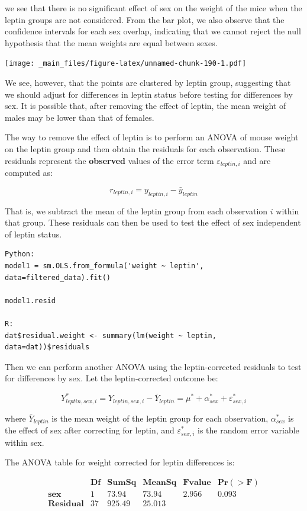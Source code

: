 \documentclass[
]{book}
\begin{document}
we see that there is no significant effect of sex on the weight of the mice when the leptin groups are not considered. From the bar plot, we also observe that the confidence intervals for each sex overlap, indicating that we cannot reject the null hypothesis that the mean weights are equal between sexes.

\texttt{[image: \_main\_files/figure-latex/unnamed-chunk-190-1.pdf]}

We see, however, that the points are clustered by leptin group, suggesting that we should adjust for differences in leptin status before testing for differences by sex. It is possible that, after removing the effect of leptin, the mean weight of males may be lower than that of females.

The way to remove the effect of leptin is to perform an ANOVA of mouse weight on the leptin group and then obtain the residuals for each observation. These residuals represent the \textbf{observed} values of the error term \(\varepsilon_{leptin,i}\) and are computed as:

\[
r_{leptin,i} = y_{leptin,i} - \bar{y}_{leptin}
\]

That is, we subtract the mean of the leptin group from each observation \(i\) within that group. These residuals can then be used to test the effect of sex independent of leptin status.

\begin{verbatim}
Python:
model1 = sm.OLS.from_formula('weight ~ leptin', data=filtered_data).fit()

model1.resid

R:
dat$residual.weight <- summary(lm(weight ~ leptin, data=dat))$residuals
\end{verbatim}

Then we can perform another ANOVA using the leptin-corrected residuals to test for differences by sex. Let the leptin-corrected outcome be:

\[
Y^*_{leptin,sex,i} = Y_{leptin,sex,i} - \bar{Y}_{leptin} = \mu^* + \alpha^*_{sex} + \varepsilon^*_{sex,i}
\]

where \(\bar{Y}_{leptin}\) is the mean weight of the leptin group for each observation, \(\alpha^*_{sex}\) is the effect of sex after correcting for leptin, and \(\varepsilon^*_{sex,i}\) is the random error variable within sex.

The ANOVA table for weight corrected for leptin differences is:

\[
\begin{array}{cccccc}
&\mathbf{Df} & \mathbf{Sum Sq} & \mathbf{Mean Sq} & \mathbf{F value} & \mathbf{Pr(>F)} \\ 
\mathbf{sex}       & 1 & 73.94 &  73.94  & 2.956 & 0.093 \\
\mathbf{Residual}  & 37 & 925.49 & 25.013  &     & \\      \end{array}
\]
\end{document}
